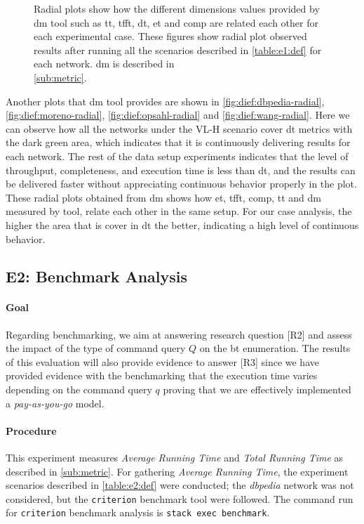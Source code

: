 \begin{figure}[!htp]
\begin{subfigure}[t]{0.45\textwidth}
    \label{fig:dief:wang-radial}
  \end{subfigure}
  \caption[{[EE] \acrshort{dm} General Results (Radial)}]{Radial plots show how the different dimensions values provided by \acrshort{dm} tool such as \acrfull{tt}, \acrfull{tfft}, \acrfull{dt}, \acrfull{et} and \acrfull{comp} are related each other for each experimental case. These figures show radial plot observed results after running all the scenarios described in \autoref{table:e1:def} for each network. \acrshort{dm} is described in \\ \autoref{sub:metric}.}
\end{figure}

Another plots that \acrshort{dm} tool provides are shown in \autoref{fig:dief:dbpedia-radial}, \autoref{fig:dief:moreno-radial}, \autoref{fig:dief:opsahl-radial} and \autoref{fig:dief:wang-radial}.
Here we can observe how all the networks under the VL-H scenario cover \acrshort{dt} metrics with the dark green area, which indicates that it is continuously delivering results for each network. 
The rest of the data setup experiments indicates that the level of throughput, completeness, and execution time is less than \acrfull{dt}, and the results can be delivered faster without appreciating continuous behavior properly in the plot. 
These radial plots obtained from \acrshort{dm} shows how \acrfull{et}, \acrfull{tfft}, \acrfull{comp}, \acrfull{tt} and \acrshort{dm} measured by tool, relate each other in the same setup. 
For our case analysis, the higher the area that is cover in \acrfull{dt} the better, indicating a high level of continuous behavior.

\subsection{E2: Benchmark Analysis}\label{sub:sec:exp-2} 
\paragraph{Goal} Regarding benchmarking, we aim at answering research question [R2] and assess  the impact of the type of command query $Q$ on the  \acrshort{bt} enumeration.
The results of this evaluation will also provide evidence to answer [R3] since we have provided evidence with the benchmarking that the execution time varies depending on the command query $q$ proving that we are effectively implemented a \emph{pay-as-you-go} model. 

\paragraph{Procedure} This experiment measures \emph{Average Running Time} and \emph{Total Running Time} as  described in \autoref{sub:metric}. 
For gathering \emph{Average Running Time}, the experiment scenarios described in \autoref{table:e2:def} were conducted; the \emph{\acrshort{dbpedia}} network was not considered, but the \texttt{criterion} \cite{criterion} benchmark tool were followed.
The command run for \texttt{criterion} benchmark analysis is \texttt{stack exec benchmark}. 

